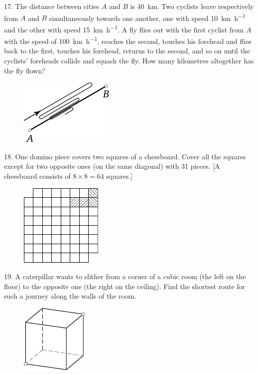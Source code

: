 \begin{problem}{17.}
	The distance between cities $A$ and $B$ is \SI{40}{\km}. Two cyclists leave respectively from $A$ and $B$ simultaneously
	towards one another, one with speed \SI{10}{\km\per\hour} and the other with speed \SI{15}{\km\per\hour}. A fly flies out with the first
	cyclist from $A$ with the speed of \SI{100}{\km\per\hour}, reaches the second, touches his forehead and flies back to the first,
	touches his forehead, returns to the second, and so on until the cyclists' foreheads collide and squash
	the fly.
	How many kilometres altogether has the fly flown?
	\begin{figure}
		\includegraphics{taskbook-1}
	\end{figure}
\end{problem}

\begin{problem}{18.}
	One domino piece covers two squares of a chessboard. 
	Cover all the squares
	except for two opposite ones (on the same diagonal) with 31 pieces. [A chessboard consists of $8 \times 8 = 64$ squares.]
	\begin{figure}
		\includegraphics{taskbook-2}
	\end{figure}
\end{problem}

\begin{problem}{19.}
	A caterpillar wants to slither from a corner of a cubic room (the left on the floor) to the opposite one
	(the right on the ceiling).
	Find the shortest route for such a journey along the walls of the room.
	\begin{figure}
		\includegraphics{taskbook-3}
	\end{figure}
\end{problem}

